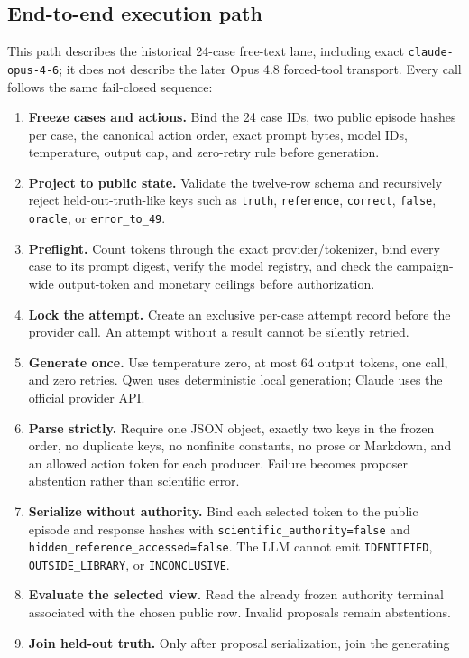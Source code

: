 \documentclass{article}
\newcommand{\ID}{\texttt{IDENTIFIED}\xspace}
\newcommand{\OUT}{\texttt{OUTSIDE\_LIBRARY}\xspace}
\newcommand{\INC}{\texttt{INCONCLUSIVE}\xspace}
\begin{document}
\subsection{End-to-end execution path}
This path describes the historical 24-case free-text lane, including exact
\texttt{claude-opus-4-6}; it does not describe the later Opus 4.8 forced-tool transport.
Every call follows the same fail-closed sequence:
\begin{enumerate}[leftmargin=*,nosep]
\item \textbf{Freeze cases and actions.} Bind the 24 case IDs, two public episode hashes per case,
the canonical action order, exact prompt bytes, model IDs, temperature, output cap, and zero-retry
rule before generation.
\item \textbf{Project to public state.} Validate the twelve-row schema and recursively reject
held-out-truth-like keys such as \texttt{truth}, \texttt{reference}, \texttt{correct}, \texttt{false},
\texttt{oracle}, or \texttt{error\_to\_49}.
\item \textbf{Preflight.} Count tokens through the exact provider/tokenizer, bind every case to its
prompt digest, verify the model registry, and check the campaign-wide output-token and monetary
ceilings before authorization.
\item \textbf{Lock the attempt.} Create an exclusive per-case attempt record before the provider
call. An attempt without a result cannot be silently retried.
\item \textbf{Generate once.} Use temperature zero, at most 64 output tokens, one call, and zero
retries. Qwen uses deterministic local generation; Claude uses the official provider API.
\item \textbf{Parse strictly.} Require one JSON object, exactly two keys in the frozen order, no
duplicate keys, no nonfinite constants, no prose or Markdown, and an allowed action token for each
producer. Failure becomes proposer abstention rather than scientific error.
\item \textbf{Serialize without authority.} Bind each selected token to the public episode and
response hashes with \texttt{scientific\_authority=false} and
\texttt{hidden\_reference\_accessed=false}. The LLM cannot emit \ID, \OUT, or \INC.
\item \textbf{Evaluate the selected view.} Read the already frozen authority terminal associated
with the chosen public row. Invalid proposals remain abstentions.
\item \textbf{Join held-out truth.} Only after proposal serialization, join the generating

\end{enumerate}
\end{document}
